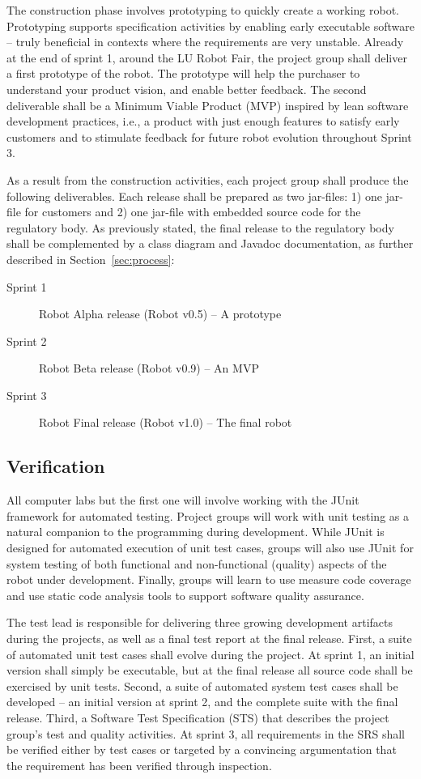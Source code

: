 \documentclass{scrreprt}
\begin{document}
\begin{description}
\end{description}

The construction phase involves prototyping to quickly create a working robot. Prototyping supports specification activities by enabling early executable software -- truly beneficial in contexts where the requirements are very unstable. Already at the end of sprint 1, around the LU Robot Fair, the project group shall deliver a first prototype of the robot. The prototype will help the purchaser to understand your product vision, and enable better feedback. The second deliverable shall be a Minimum Viable Product (MVP) inspired by lean software development practices, i.e., a product with just enough features to satisfy early customers and to stimulate feedback for future robot evolution throughout Sprint 3. 

As a result from the construction activities, each project group shall produce the following deliverables. Each release shall be prepared as two jar-files: 1) one jar-file for customers and 2) one jar-file with embedded source code for the regulatory body. As previously stated, the final release to the regulatory body shall be complemented by a class diagram and Javadoc documentation, as further described in Section~\ref{sec:process}:
\begin{description}
\item[Sprint 1] Robot Alpha release (Robot v0.5) -- A prototype
\item[Sprint 2] Robot Beta release (Robot v0.9) -- An MVP
\item[Sprint 3] Robot Final release (Robot v1.0) -- The final robot
\end{description}

\subsection{Verification}
All computer labs but the first one will involve working with the JUnit framework for automated testing. Project groups will work with unit testing as a natural companion to the programming during development. While JUnit is designed for automated execution of unit test cases, groups will also use JUnit for system testing of both functional and non-functional (quality) aspects of the robot under development. Finally, groups will learn to use measure code coverage and use static code analysis tools to support software quality assurance.

The test lead is responsible for delivering three growing development artifacts during the projects, as well as a final test report at the final release. First, a suite of automated unit test cases shall evolve during the project. At sprint 1, an initial version shall simply be executable, but at the final release all source code shall be exercised by unit tests. Second, a suite of automated system test cases shall be developed -- an initial version at sprint 2, and the complete suite with the final release. Third, a Software Test Specification (STS) that describes the project group's test and quality activities. At sprint 3, all requirements in the SRS shall be verified either by test cases or targeted by a convincing argumentation that the requirement has been verified through inspection.
\end{document}
